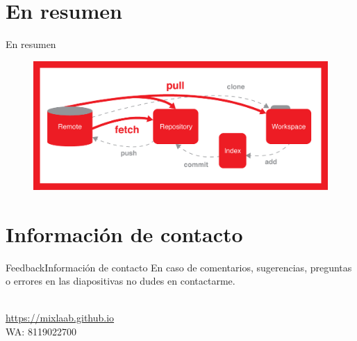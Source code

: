 \documentclass[10pt]{beamer}
\newcommand{\chref}[2]{%
  \href{#1}{{\usebeamercolor[bg]{Aalborg}#2}}%
}
\begin{document}
\section{En resumen}

\begin{frame}{En resumen}{}


\begin{figure}[h!]
\centering
\includegraphics [scale=0.25]{gitnutshell}
\label{fig:gitstatus}
\end{figure}


\end{frame}

\section{Información de contacto}
\begin{frame}{Feedback}{Información de contacto}
En caso de comentarios, sugerencias, preguntas o errores en las diapositivas no dudes en contactarme.
  \begin{center}
    \insertauthor\\
    \chref{https://mixlaab.github.io}{https://mixlaab.github.io}\\
    WA: 8119022700\\
  \end{center}
\end{frame}

{\aauwavesbg%
\begin{frame}%
\end{frame}}
\end{document}
